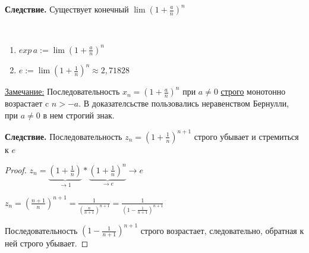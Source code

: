    \textbf{Следствие.} Существует конечный $\lim (1 + \frac{a}{n})^n$ 
    \begin{conj} \quad \\
        \begin{enumerate}
            \item $exp\,a := \lim (1 + \frac{a}{n})^n$
            \item $e := \lim (1 + \frac{1}{n})^n \approx 2,71828$
        \end{enumerate}
    \end{conj}
    \underline{Замечание:} Последовательность $x_n = (1 + \frac{a}{n})^n$ при $a \neq 0$ \underline{строго} монотонно возрастает c $n > -a$. В доказателсьстве пользовались неравенством Бернулли, при $a \neq 0$ в нем строгий знак.
    \vspace{0.5cm}
    
    \textbf{Следствие.} Последовательность $z_n = (1 + \frac{1}{n})^{n+1}$ строго убывает и стремиться к $e$
    \begin{proof}
        $z_n = \underbrace{(1 + \frac{1}{n})}_{\to 1} * \underbrace{(1 + \frac{1}{n})^n}_{\to e} \to e$
        
        $z_n = (\frac{n + 1}{n})^{n+1} = \frac{1}{(\frac{n}{n+1})^{n+1}} = \frac{1}{(1 - \frac{1}{n+1})^{n+1}}$
        
        Последовательность $(1 - \frac{1}{n+1})^{n+1}$ строго возрастает, следовательно, обратная к ней строго убывает. 
    \end{proof}